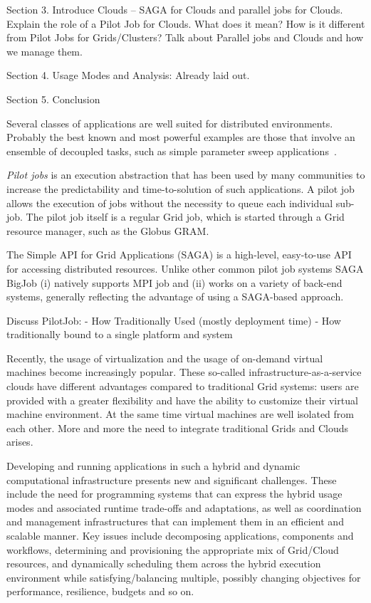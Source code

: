 \documentclass[conference,final]{IEEEtran}
\newcommand{\up}{\vspace*{-1em}}
\begin{document}
\bigskip 

Section 3. Introduce Clouds -- SAGA for Clouds and parallel jobs for
Clouds. Explain the role of a Pilot Job for Clouds. What does it mean?
How is it different from Pilot Jobs for Grids/Clusters?  Talk about
Parallel jobs and Clouds and how we manage them.

\bigskip 

Section 4. Usage Modes and Analysis: Already laid out.

\bigskip 
Section 5. Conclusion


Several classes of applications are well suited for distributed
environments. Probably the best known and most powerful examples are
those that involve an ensemble of decoupled tasks, such as simple
parameter sweep applications~\cite{1239909}.

\emph{Pilot jobs} is an execution abstraction that 
has been used by many communities to increase the predictability and
time-to-solution of such applications. A pilot job allows the
execution of jobs without the necessity to queue each individual
sub-job. The pilot job itself is a regular Grid job, which is started
through a Grid resource manager, such as the Globus GRAM.

The Simple API for Grid Applications (SAGA) is a high-level,
easy-to-use API for accessing distributed resources. Unlike other
common pilot job systems SAGA BigJob (i) natively supports MPI job and
(ii) works on a variety of back-end systems, generally reflecting the
advantage of using a SAGA-based approach.

Discuss PilotJob:
- How Traditionally Used (mostly deployment time)
- How traditionally bound to a single platform and system

Recently, the usage of virtualization and the usage of on-demand
virtual machines become increasingly popular. These so-called
infrastructure-as-a-service clouds have different advantages compared
to traditional Grid systems: users are provided with a greater
flexibility and have the ability to customize their virtual machine
environment. At the same time virtual machines are well isolated from
each other. More and more the need to integrate traditional Grids and
Clouds arises.

Developing and running applications in such a hybrid and dynamic computational 
infrastructure presents new and significant challenges. These include the need for programming 
systems that can express the hybrid usage modes and associated runtime trade-offs and adaptations, 
as well as coordination and management infrastructures that can implement them in an efficient 
and scalable manner. Key issues include decomposing applications, components and workflows, 
determining and provisioning the appropriate mix of Grid/Cloud resources, and dynamically scheduling 
them across the hybrid execution environment while satisfying/balancing multiple, possibly changing 
objectives for performance, resilience, budgets and so on.
\end{document}
